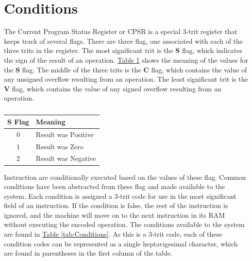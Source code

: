 \documentclass[12pt]{article}
\begin{document}
\section{Conditions} \label{sec:Conditions}

The Current Program Status Register or CPSR is a special 3-trit register that keeps track of several
flags. There are three flag, one associated with each of the three trits in the register. The most
significant trit is the \textbf{S} flag, which indicates the sign of the result of an operation.
\hyperref[tab:S Flag Values]{Table \ref{tab:S Flag Values}} shows the meaning of the values for the
\textbf{S} flag. The middle of the three trits is the \textbf{C} flag, which contains the value of
any unsigned overflow resulting from an operation. The least significant trit is the \textbf{V} flag,
which contains the value of any signed overflow resulting from an operation.

\begin{table}[h!]
    \centering
    \caption{}
    \label{tab:S Flag Values}
    \begin{tabular}{|c|l|} 
        \hline
        \textbf{S} Flag & Meaning \\ \hline
        0 & Result was Positive \\ \hline
        1 & Result was Zero \\ \hline
        2 & Result was Negative \\ \hline
    \end{tabular}
\end{table}

Instruction are conditionally executed based on the values of these flag. Common conditions have been
abstracted from these flag and made available to the system. Each condition is assigned a 3-trit code
for use in the most significant field of an instruction. If the condition is false, the rest of the
instruction is ignored, and the machine will move on to the next instruction in its RAM without executing
the encoded operation. The conditions available to the system are found in
\hyperref[tab:Conditions]{Table \ref{tab:Conditions}}. As this is a 3-trit code, each of these condition
codes can be represented as a single heptavigesimal character, which are found in parentheses in the
first column of the table.
\end{document}
